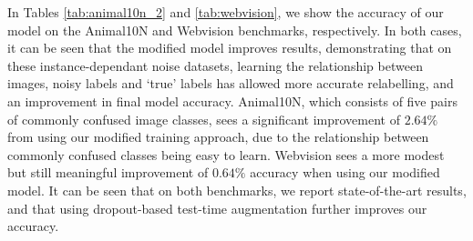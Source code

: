 \documentclass[10pt,twocolumn,letterpaper]{article}
\begin{document}
\begin{table}[t!]
    \begin{center}
    \end{center}
    \caption{Test accuracy (\%) for Webvision. Top methods within 0.5\% in \textbf{bold}}
    \label{tab:webvision}
\end{table}



In Tables \ref{tab:animal10n_2} and \ref{tab:webvision}, we show the accuracy of our model on the Animal10N and Webvision benchmarks, respectively. In both cases, it can be seen that the modified model improves results, demonstrating that on these instance-dependant noise datasets, learning the relationship between images, noisy labels and `true' labels has allowed more accurate relabelling, and an improvement in final model accuracy. Animal10N, which consists of five pairs of commonly confused image classes, sees a significant improvement of $2.64\%$ from using our modified training approach, due to the relationship between commonly confused classes being easy to learn. Webvision sees a more modest but still meaningful improvement of $0.64\%$ accuracy when using our modified model.
It can be seen that on both benchmarks, we report state-of-the-art results, and that using dropout-based test-time augmentation further improves our accuracy.
\end{document}
